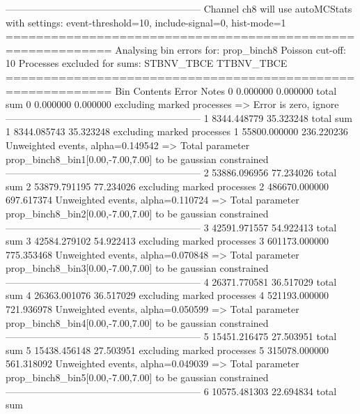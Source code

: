 ------------------------------------------------------------
Channel ch8 will use autoMCStats with settings: event-threshold=10, include-signal=0, hist-mode=1
============================================================
Analysing bin errors for: prop_binch8
Poisson cut-off: 10
Processes excluded for sums: STBNV_TBCE TTBNV_TBCE
============================================================
Bin        Contents        Error           Notes                         
0          0.000000        0.000000        total sum                     
0          0.000000        0.000000        excluding marked processes    
  => Error is zero, ignore      
------------------------------------------------------------
1          8344.448779     35.323248       total sum                     
1          8344.085743     35.323248       excluding marked processes    
1          55800.000000    236.220236      Unweighted events, alpha=0.149542
  => Total parameter prop_binch8_bin1[0.00,-7.00,7.00] to be gaussian constrained
------------------------------------------------------------
2          53886.096956    77.234026       total sum                     
2          53879.791195    77.234026       excluding marked processes    
2          486670.000000   697.617374      Unweighted events, alpha=0.110724
  => Total parameter prop_binch8_bin2[0.00,-7.00,7.00] to be gaussian constrained
------------------------------------------------------------
3          42591.971557    54.922413       total sum                     
3          42584.279102    54.922413       excluding marked processes    
3          601173.000000   775.353468      Unweighted events, alpha=0.070848
  => Total parameter prop_binch8_bin3[0.00,-7.00,7.00] to be gaussian constrained
------------------------------------------------------------
4          26371.770581    36.517029       total sum                     
4          26363.001076    36.517029       excluding marked processes    
4          521193.000000   721.936978      Unweighted events, alpha=0.050599
  => Total parameter prop_binch8_bin4[0.00,-7.00,7.00] to be gaussian constrained
------------------------------------------------------------
5          15451.216475    27.503951       total sum                     
5          15438.456148    27.503951       excluding marked processes    
5          315078.000000   561.318092      Unweighted events, alpha=0.049039
  => Total parameter prop_binch8_bin5[0.00,-7.00,7.00] to be gaussian constrained
------------------------------------------------------------
6          10575.481303    22.694834       total sum                     
